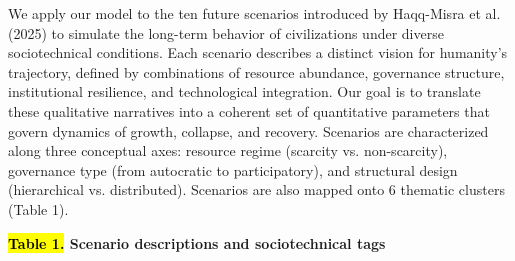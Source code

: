 We apply our model to the ten future scenarios introduced by Haqq-Misra et al. (2025) to simulate the long-term behavior of civilizations under diverse sociotechnical conditions. Each scenario describes a distinct vision for humanity's trajectory, defined by combinations of resource abundance, governance structure, institutional resilience, and technological integration. Our goal is to translate these qualitative narratives into a coherent set of quantitative parameters that govern dynamics of growth, collapse, and recovery. Scenarios are characterized along three conceptual axes: resource regime (scarcity vs. non-scarcity), governance type (from autocratic to participatory), and structural design (hierarchical vs. distributed). Scenarios are also mapped onto 6 thematic clusters (Table 1).

\textbf{\hl{Table 1.} Scenario descriptions and sociotechnical tags}

